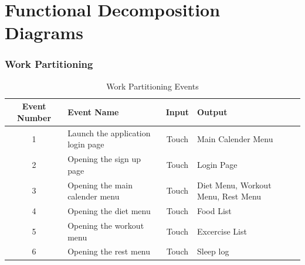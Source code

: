 \documentclass[12pt,letterpaper]{article}
\begin{document}
\section{Functional Decomposition Diagrams}

\subsubsection{Work Partitioning}
\begin{table}[H]
\caption{Work Partitioning Events}
\centering
\begin{tabular}{|c|p{3.5cm}|c|p{3.5cm}|}
\hline
\textbf{Event Number} & \centering\textbf{Event Name} & \textbf{Input} & \textbf{Output} \\
\hline
1 & Launch the application login page & Touch & Main Calender Menu \\
\hline
2 & Opening the sign up page & Touch & Login Page \\
\hline
3 & Opening the main calender menu & Touch & Diet Menu, Workout Menu, Rest Menu \\
\hline
4 & Opening the diet menu  & Touch & Food List \\
\hline
5 & Opening the workout menu & Touch & Excercise List \\
\hline
6 & Opening the rest menu & Touch & Sleep log \\
\hline
\end{tabular}
\end{table}
\end{document}
